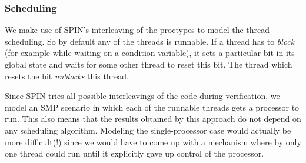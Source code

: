 
\subsubsection{Scheduling}
We make use of SPIN's interleaving of the proctypes to model the
thread scheduling. So by default any of the threads is runnable. If a
thread has to {\it block} (for example while waiting on a condition 
variable), it
sets a particular bit in its global state and waits for some other
thread to reset this bit. The thread which resets the bit
{\it unblocks} this thread. 

Since SPIN tries all possible interleavings of the code during
verification, we model an SMP scenario in which each of the runnable
threads gets a processor to run. This also means that the results
obtained by this approach do not depend on any scheduling algorithm. 
Modeling the single-processor case would actually be more difficult(!)\@
since we would have to come up with a mechanism where by only one thread
could run until it explicitly gave up control of the processor.

